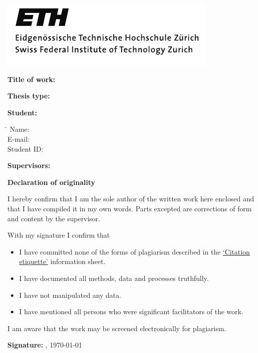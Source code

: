 \newpage
\thispagestyle{empty}
\setlength{\parindent}{0cm}

\hspace{-0.4cm}
\includegraphics[]{template_figures/ETH_Logo_withText.pdf}

\vspace{1.5cm}

\normalsize\textbf{Title of work:}\\
\LARGE\myTitle

\vspace{1cm}

\normalsize\textbf{Thesis type:}\\
\LARGE\thesisType

\vspace{1cm}

\normalsize\textbf{Student:}
\vspace{-0.2cm}
\begin{tabbing}
    \hspace*{3cm}  \= \kill
    Name: \> \myName \\
    E-mail: \> \myEmail \\
    Student ID: \> \myStudentID
\end{tabbing}

\vspace{0.8cm}

\textbf{Supervisors:}\vspace{0.1cm}\\
\supervisors

\vspace{1cm}

\textbf{Declaration of originality}

\vspace{0.1cm}

I hereby confirm that I am the sole author of the written work here enclosed and that I have compiled it in my own words. Parts excepted are corrections of form and content by the supervisor.

\vspace{0.4cm}

With my signature I confirm that
\begin{itemize}
    \item I have committed none of the forms of plagiarism described in the \href{https://ethz.ch/students/en/studies/performance-assessments/plagiarism.html}{‘Citation etiquette’}  information sheet.
    \item I have documented all methods, data and processes truthfully.
    \item I have not manipulated any data.
    \item I have mentioned all persons who were significant facilitators of the work.
\end{itemize}
I am aware that the work may be screened electronically for plagiarism.

\vspace{2cm}

\textbf{Signature:} \hspace{0.75cm} \myLocation, \today \hspace{0.5cm} \hrulefill \hspace{2cm}
